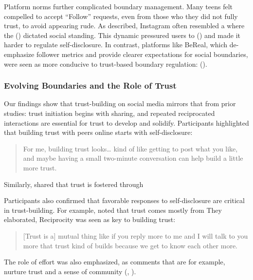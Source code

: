 Platform norms further complicated boundary management. Many teens felt compelled to accept ``Follow'' requests, even from those who they did not fully trust, to avoid appearing rude. As  described, Instagram often resembled a  where the  () dictated social standing. This dynamic pressured users to  () and made it harder to regulate self-disclosure. In contrast, platforms like BeReal, which de-emphasize follower metrics and provide clearer expectations for social boundaries, were seen as more conducive to trust-based boundary regulation:  ().

\subsubsection{\textbf{Evolving Boundaries and the Role of Trust}}
\label{section:4-1-4}
Our findings show that trust-building on social media mirrors that from prior studies: trust initiation begins with sharing, and repeated reciprocated interactions are essential for trust to develop and solidify. Participants highlighted that building trust with peers online starts with self-disclosure:
\blockquote{For me, building trust looks\ldots{} kind of like getting to post what you like, and maybe having a small two-minute conversation can help build a little more trust.}{}
Similarly,  shared that trust is fostered through  

Participants also confirmed that favorable responses to self-disclosure are critical in trust-building. For example,  noted that trust comes mostly from  They elaborated,  Reciprocity was seen as key to building trust:
\blockquote{[Trust is a] mutual thing like if you reply more to me and I will talk to you more that trust kind of builds because we get to know each other more.}{}
The role of effort was also emphasized, as comments that are  for example, nurture trust and a sense of community (, ). 

